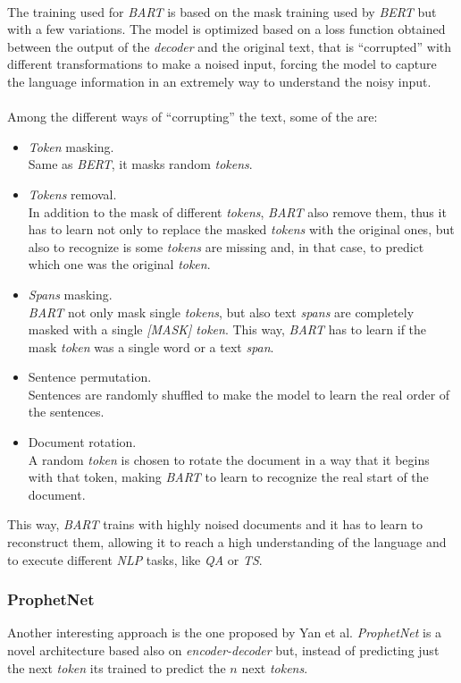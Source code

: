 \paragraph{}
The training used for \emph{BART} is based on the mask training used by \emph{BERT} but with a few variations. The model is optimized based on a loss function obtained between the output of the \emph{decoder} and the original text, that is ``corrupted'' with different transformations to make a noised input, forcing the model to capture the language information in an extremely way to understand the noisy input.
\paragraph{}
Among the different ways of ``corrupting'' the text, some of the are:
\begin{itemize}
\item \emph{Token} masking. \\ Same as \emph{BERT}, it masks random \emph{tokens}.
\item \emph{Tokens} removal. \\ In addition to the mask of different \emph{tokens}, \emph{BART} also remove them, thus it has to learn not only to replace the masked \emph{tokens} with the original ones, but also to recognize is some \emph{tokens} are missing and, in that case, to predict which one was the original \emph{token}.
\item \emph{Spans} masking. \\ \emph{BART} not only mask single \emph{tokens}, but also text \emph{spans} are completely masked with a single \emph{[MASK] token}. This way, \emph{BART} has to learn if the mask \emph{token} was a single word or a text \emph{span}. 
\item Sentence permutation. \\ Sentences are randomly shuffled to make the model to learn the real order of the sentences.
\item Document rotation. \\ A random \emph{token} is chosen to rotate the document in a way that it begins with that token, making \emph{BART} to learn to recognize the real start of the document.
\end{itemize}
This way, \emph{BART} trains with highly noised documents and it has to learn to reconstruct them, allowing it to reach a high understanding of the language and to execute different \emph{NLP} tasks, like \emph{QA} or \emph{TS}.
\subsubsection{ProphetNet}
\noindent Another interesting approach is the one proposed by Yan et al.\cite{Yan2020} \emph{ProphetNet} is a novel architecture based also on \emph{encoder-decoder} but, instead of predicting just the next \emph{token} its trained to predict the $n$ next \emph{tokens}.
